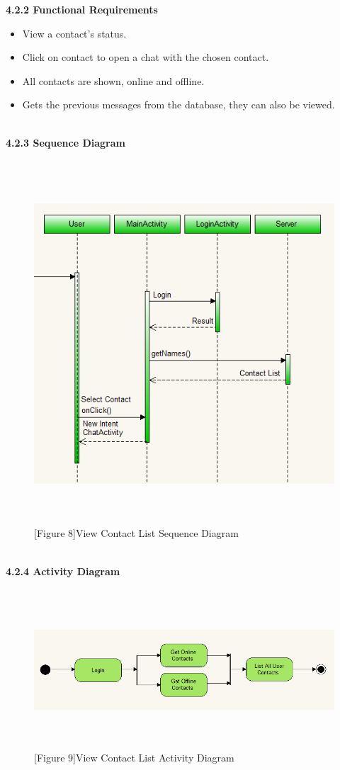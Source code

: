 \documentclass[29pt,a4paper]{moderncv}
\begin{document}
		\noindent\textbf{4.2.2 Functional Requirements}
			\begin{itemize}
				\item View a contact’s status.
				\item Click on contact to open a chat with the chosen contact.
				\item All contacts are shown, online and offline.
				\item Gets the previous messages from the database, they can also be viewed.\\
			\end{itemize}
\newpage
		\\ \left\textbf{4.2.3 Sequence Diagram} \\
			\begin{figure}
				\centering
				 \\ \includegraphics[width=5.5in, height=5.0in]{./viewContactsActivity.png}
				\\\caption{[Figure 8]View Contact List Sequence Diagram}
			\end{figure}	
			\newpage
			\\ \left\textbf{4.2.4 Activity Diagram} \\
						\begin{figure}
							\centering
							 \\ \includegraphics[width=5.5in, height=2.0in]{./acContactList.png}
							\\\caption{[Figure 9]View Contact List Activity Diagram}
						\end{figure}	
\end{document}
